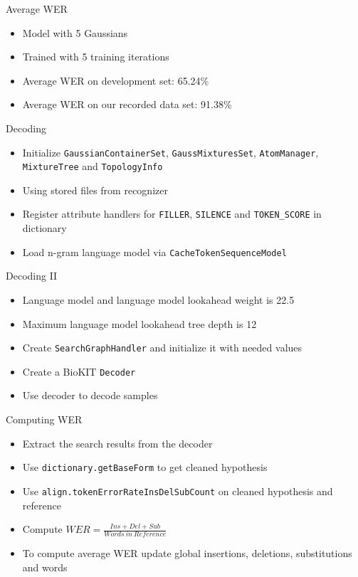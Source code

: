 \documentclass[18pt]{beamer}
\begin{document}
\begin{frame}{Average WER}
\begin{itemize}
\item Model with 5 Gaussians
\item Trained with 5 training iterations
\item Average WER on development set: 65.24\%
\item Average WER on our recorded data set: 91.38\%
\end{itemize}
\end{frame}

\begin{frame}{Decoding}
\begin{itemize}
\item Initialize \texttt{GaussianContainerSet}, \texttt{GaussMixturesSet}, \texttt{AtomManager}, \texttt{MixtureTree} and \texttt{TopologyInfo}
\item Using stored files from recognizer
\item Register attribute handlers for \texttt{FILLER}, \texttt{SILENCE} and \texttt{TOKEN\_SCORE} in dictionary
\item Load n-gram language model via \texttt{CacheTokenSequenceModel}
\end{itemize}
\end{frame}

\begin{frame}{Decoding II}
\begin{itemize}
\item Language model and language model lookahead weight is 22.5
\item Maximum language model lookahead tree depth is 12
\item Create \texttt{SearchGraphHandler} and initialize it with needed values
\item Create a BioKIT \texttt{Decoder}
\item Use decoder to decode samples
\end{itemize}
\end{frame}

\begin{frame}{Computing WER}
\begin{itemize}
\item Extract the search results from the decoder
\item Use \texttt{dictionary.getBaseForm} to get cleaned hypothesis
\item Use \texttt{align.tokenErrorRateInsDelSubCount} on cleaned hypothesis and reference
\item Compute $WER = \frac{Ins + Del + Sub}{Words\:in\:Reference}$
\item To compute average WER update global insertions, deletions, substitutions and words
\end{itemize}
\end{frame}
\end{document}
